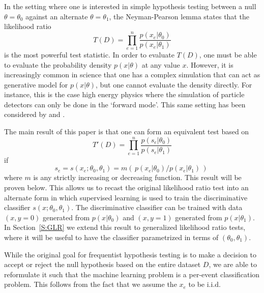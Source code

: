 \documentclass{article} %
\begin{document}
In the setting where one is interested in simple hypothesis testing between a null $\theta=\theta_0$ against an alternate $\theta=\theta_1$, the Neyman-Pearson lemma states that the likelihood ratio 
\begin{equation}
T(D) = \prod_{e=1}^n \frac{ p(x_e|\theta_0)}{ p(x_e|\theta_1)}
\end{equation}
is the most powerful test statistic. In order to evaluate $T(D)$, one must be able to evaluate the probability density 
$p(x| \theta)$ at any value $x$. However, it is increasingly common in science that one has a complex simulation that 
can act as generative model  for $p(x|\theta)$, but one cannot evaluate the density directly. For instance, this is the case 
high energy physics where the simulation of particle detectors can only be done in the `forward mode'. This same setting has been considered by \cite{ClaytonScott} and \cite{JMLR:v14:tong13a}.

The main result of this paper is that one can form an equivalent test based on 
\begin{equation}\label{eq:equivLRtest}
T'(D) = \prod_{e=1}^n \frac{ p(s_e | \theta_0)}{ p(s_e | \theta_1)}
\end{equation}
if 
\begin{equation}\label{eq:montonic}
s_e = s(x_e; \theta_0, \theta_1) = m\left(\, p(x_e|\theta_0) / p(x_e|\theta_1) \,\right) \; 
\end{equation}
where $m$ is any strictly increasing or decreasing function. This result will be proven below.
This allows us to recast the original likelihood ratio test into an alternate form in which supervised learning is used to train the discriminative classifier $s(x; \theta_0, \theta_1)$. The discriminative classifier can be trained with data $(x,y=0)$ generated 
from $p(x|\theta_0)$ and $(x,y=1)$ generated from $p(x|\theta_1)$. In Section~\ref{S:GLR} we extend this result to generalized likelihood ratio tests, where it will be useful to have the classifier  parametrized in terms of $(\theta_0, \theta_1)$.

While the original goal for frequentist hypothesis testing is to make a decision to accept or reject the null hypothesis based on the entire dataset $D$, we are able to reformulate it such that the machine learning problem is a per-event classification problem. This follows from the fact that we assume the $x_e$ to be i.i.d.
\end{document}
